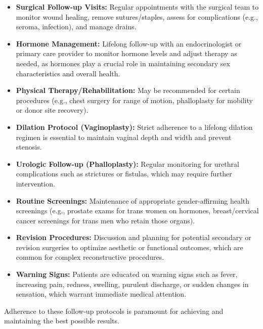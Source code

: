 \begin{itemize}
  \item \textbf{Surgical Follow-up Visits:} Regular appointments with the surgical team to monitor wound healing, remove sutures/staples, assess for complications (e.g., seroma, infection), and manage drains.
  \item \textbf{Hormone Management:} Lifelong follow-up with an endocrinologist or primary care provider to monitor hormone levels and adjust therapy as needed, as hormones play a crucial role in maintaining secondary sex characteristics and overall health.
  \item \textbf{Physical Therapy/Rehabilitation:} May be recommended for certain procedures (e.g., chest surgery for range of motion, phalloplasty for mobility or donor site recovery).
  \item \textbf{Dilation Protocol (Vaginoplasty):} Strict adherence to a lifelong dilation regimen is essential to maintain vaginal depth and width and prevent stenosis.
  \item \textbf{Urologic Follow-up (Phalloplasty):} Regular monitoring for urethral complications such as strictures or fistulas, which may require further intervention.
  \item \textbf{Routine Screenings:} Maintenance of appropriate gender-affirming health screenings (e.g., prostate exams for trans women on hormones, breast/cervical cancer screenings for trans men who retain those organs).
  \item \textbf{Revision Procedures:} Discussion and planning for potential secondary or revision surgeries to optimize aesthetic or functional outcomes, which are common for complex reconstructive procedures.
  \item \textbf{Warning Signs:} Patients are educated on warning signs such as fever, increasing pain, redness, swelling, purulent discharge, or sudden changes in sensation, which warrant immediate medical attention.
\end{itemize}
Adherence to these follow-up protocols is paramount for achieving and maintaining the best possible results.

